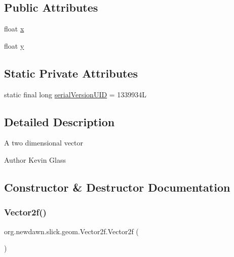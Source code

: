 \subsection*{Public Attributes}
\begin{DoxyCompactItemize}
\item 
float \mbox{\hyperlink{classorg_1_1newdawn_1_1slick_1_1geom_1_1_vector2f_a3c72cdf13ebc511a472e1a02002fa579}{x}}
\item 
float \mbox{\hyperlink{classorg_1_1newdawn_1_1slick_1_1geom_1_1_vector2f_aa03914f0c3d32063aa90e5bd7b74688e}{y}}
\end{DoxyCompactItemize}
\subsection*{Static Private Attributes}
\begin{DoxyCompactItemize}
\item 
static final long \mbox{\hyperlink{classorg_1_1newdawn_1_1slick_1_1geom_1_1_vector2f_a5d55b062f6a2eb4893390a9a99730f5f}{serial\+Version\+U\+ID}} = 1339934L
\end{DoxyCompactItemize}


\subsection{Detailed Description}
A two dimensional vector

\begin{DoxyAuthor}{Author}
Kevin Glass 
\end{DoxyAuthor}


\subsection{Constructor \& Destructor Documentation}
\mbox{\label{classorg_1_1newdawn_1_1slick_1_1geom_1_1_vector2f_a3b8e9eda9c9203462324bf4bc8e42153}} 
\subsubsection{\texorpdfstring{Vector2f()}{Vector2f()}\hspace{0.1cm}{\footnotesize\ttfamily [1/5]}}
{\footnotesize\ttfamily org.\+newdawn.\+slick.\+geom.\+Vector2f.\+Vector2f (\begin{DoxyParamCaption}{ }\end{DoxyParamCaption})\hspace{0.3cm}{\ttfamily [inline]}}

